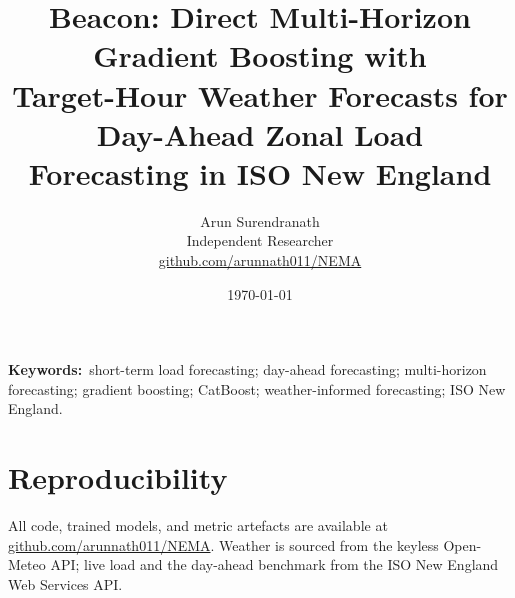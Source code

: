 \documentclass[11pt]{article}
\title{\textbf{Beacon: Direct Multi-Horizon Gradient Boosting with\\
Target-Hour Weather Forecasts for Day-Ahead Zonal Load\\
Forecasting in ISO New England}}
\author{Arun Surendranath\\[2pt]
\small Independent Researcher\\
\small \href{https://github.com/arunnath011/NEMA}{github.com/arunnath011/NEMA}}
\date{\today}
\begin{document}
\maketitle

\begin{abstract}

\end{abstract}

\smallskip
\noindent\textbf{\small Keywords:}~{\small short-term load forecasting; day-ahead
forecasting; multi-horizon forecasting; gradient boosting; CatBoost;
weather-informed forecasting; ISO New England.}
\medskip











\section*{Reproducibility}
All code, trained models, and metric artefacts are available at
\href{https://github.com/arunnath011/NEMA}{github.com/arunnath011/NEMA}. Weather is sourced from
the keyless Open-Meteo API; live load and the day-ahead benchmark from the ISO New England Web
Services API.



\end{document}
